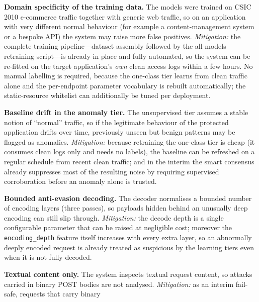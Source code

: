 \documentclass[../main.tex]{subfiles}
\begin{document}
\begin{romanlist}
  \item \textbf{Domain specificity of the training data.} The models were
        trained on CSIC 2010 e-commerce traffic together with generic web
        traffic, so on an application with very different normal behaviour (for
        example a content-management system or a bespoke API) the system may
        raise more false positives. \emph{Mitigation:} the complete training
        pipeline---dataset assembly followed by the all-models retraining
        script---is already in place and fully automated, so the system can be
        re-fitted on the target application's \emph{own} clean access logs
        within a few hours. No manual labelling is required, because the
        one-class tier learns from clean traffic alone and the per-endpoint
        parameter vocabulary is rebuilt automatically; the static-resource
        whitelist can additionally be tuned per deployment.
  \item \textbf{Baseline drift in the anomaly tier.} The unsupervised tier
        assumes a stable notion of ``normal'' traffic, so if the legitimate
        behaviour of the protected application drifts over time, previously
        unseen but benign patterns may be flagged as anomalies.
        \emph{Mitigation:} because retraining the one-class tier is cheap (it
        consumes clean logs only and needs no labels), the baseline can be
        refreshed on a regular schedule from recent clean traffic; and in the
        interim the smart consensus already suppresses most of the resulting
        noise by requiring supervised corroboration before an anomaly alone is
        trusted.
  \item \textbf{Bounded anti-evasion decoding.} The decoder normalises a
        bounded number of encoding layers (three passes), so payloads hidden
        behind an unusually deep encoding can still slip through.
        \emph{Mitigation:} the decode depth is a single configurable
        parameter that can be raised at negligible cost; moreover the
        \texttt{encoding\_depth} feature itself increases with every extra
        layer, so an abnormally deeply encoded request is already treated as
        suspicious by the learning tiers even when it is not fully decoded.
  \item \textbf{Textual content only.} The system inspects textual request
        content, so attacks carried in binary POST bodies are not analysed.
        \emph{Mitigation:} as an interim fail-safe, requests that carry binary

\end{romanlist}
\end{document}
